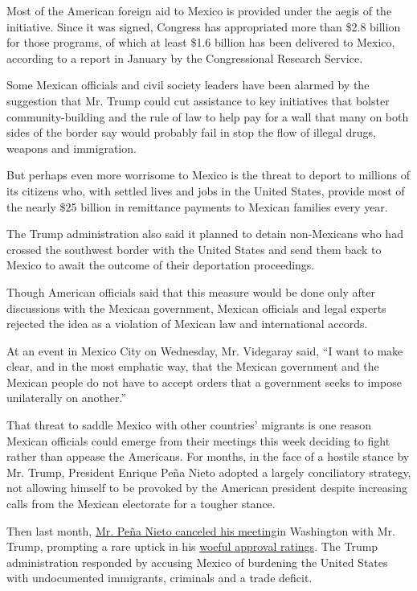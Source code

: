 Most of the American foreign aid to Mexico is provided under the aegis
of the initiative. Since it was signed, Congress has appropriated more
than \$2.8 billion for those programs, of which at least \$1.6 billion
has been delivered to Mexico, according to a report in January by the
Congressional Research Service.

Some Mexican officials and civil society leaders have been alarmed by
the suggestion that Mr. Trump could cut assistance to key initiatives
that bolster community-building and the rule of law to help pay for a
wall that many on both sides of the border say would probably fail in
stop the flow of illegal drugs, weapons and immigration.

But perhaps even more worrisome to Mexico is the threat to deport to
millions of its citizens who, with settled lives and jobs in the United
States, provide most of the nearly \$25 billion in remittance payments
to Mexican families every year.

The Trump administration also said it planned to detain non-Mexicans who
had crossed the southwest border with the United States and send them
back to Mexico to await the outcome of their deportation proceedings.

Though American officials said that this measure would be done only
after discussions with the Mexican government, Mexican officials and
legal experts rejected the idea as a violation of Mexican law and
international accords.

At an event in Mexico City on Wednesday, Mr. Videgaray said, ``I want to
make clear, and in the most emphatic way, that the Mexican government
and the Mexican people do not have to accept orders that a government
seeks to impose unilaterally on another.''

That threat to saddle Mexico with other countries' migrants is one
reason Mexican officials could emerge from their meetings this week
deciding to fight rather than appease the Americans. For months, in the
face of a hostile stance by Mr. Trump, President Enrique Peña Nieto
adopted a largely conciliatory strategy, not allowing himself to be
provoked by the American president despite increasing calls from the
Mexican electorate for a tougher stance.

Then last month,
\href{https://www.nytimes.com/2017/01/26/world/americas/mexico-pena-nieto-donald-trump.html}{Mr.
Peña Nieto canceled his meeting}in Washington with Mr. Trump, prompting
a rare uptick in his
\href{https://www.nytimes.com/2017/01/25/world/americas/trump-mexico-border-wall.html}{woeful
approval ratings}. The Trump administration responded by accusing Mexico
of burdening the United States with undocumented immigrants, criminals
and a trade deficit.

